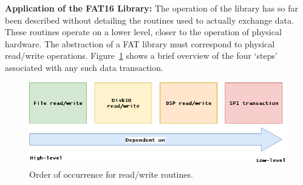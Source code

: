     
    


\label{ssss:FAT_application}
\textbf{Application of the FAT16 Library:} The operation of the library has so far been described without detailing the routines used to actually exchange data. These routines operate on a lower level, closer to the operation of physical hardware.  The abstraction of a FAT library must correspond to physical read/write operations. Figure~\ref{fig:FAT_readwrite} shows a brief overview of the four `steps' associated with any such data transaction. 

\begin{figure}[H]
    \centering
    \includegraphics[width=1\textwidth]{Figures/4_details/FAT-RWflow.png} 
    \caption{Order of occurrence for read/write routines.}
    \label{fig:FAT_readwrite}
\end{figure}

